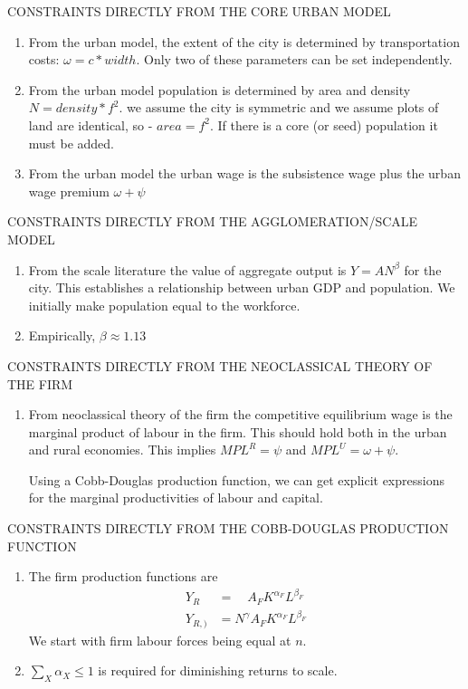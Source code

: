 CONSTRAINTS DIRECTLY FROM THE CORE URBAN MODEL
\begin{enumerate}
    \item From the urban model, the extent of the city is determined by transportation costs:   $\omega =c*width$.  Only two of these parameters can be set independently.

    \item From the urban model population is determined by area and density   $N=density* f^2$. we assume the city is symmetric  and we assume plots  of land are identical, so  - $area=f^2$. If there is a core (or seed) population it must be added.  
   
    \item From the urban model the urban wage is the subsistence wage plus the urban wage premium $\omega+\psi$ 
\end{enumerate}

CONSTRAINTS DIRECTLY FROM THE AGGLOMERATION/SCALE MODEL
\begin{enumerate}
    \item From the scale literature the value of aggregate output is $Y=AN^\beta$ for the city. This establishes a relationship between urban GDP and population. We initially make population equal to the workforce. 

    \item Empirically, $\beta \approx 1.13$
\end{enumerate}

CONSTRAINTS DIRECTLY FROM THE NEOCLASSICAL THEORY OF THE FIRM
\begin{enumerate}
    \item From neoclassical theory of the firm the competitive equilibrium wage is the  marginal product of labour in the firm.      This should hold both in the urban and rural economies. This implies       $ MPL^R=\psi$  and $ MPL^U=\omega+\psi $.

    Using a Cobb-Douglas production function, we can get explicit expressions for the marginal productivities of labour and capital. 
\end{enumerate}

CONSTRAINTS DIRECTLY FROM THE COBB-DOUGLAS PRODUCTION FUNCTION
\begin{enumerate}
\item The firm production functions are 
\begin{align}
Y_R  &= \quad  A_FK^{\alpha_F}L^{\beta_F}\\
Y_{R, )} &= N^\gamma A_FK^{\alpha_F}L^{\beta_F}
\end{align}
We start with firm labour forces  being equal at $n$.

\item $\sum_X \alpha_X \le 1$ is required for diminishing returns to scale. 

\end{enumerate}


